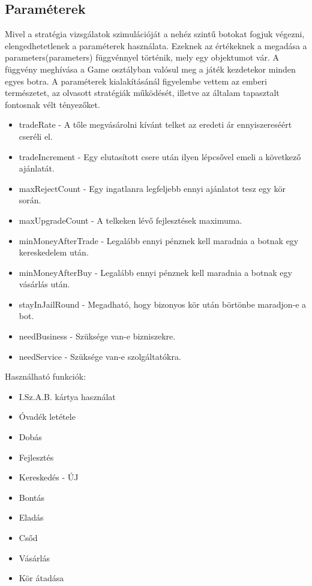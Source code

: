 \subsection{Paraméterek}

Mivel a stratégia vizsgálatok szimulációját a nehéz szintű botokat fogjuk végezni, elengedhetetlenek a paraméterek használata. Ezeknek az értékeknek a megadása a parameters(parameters) függvénnyel történik, mely egy objektumot vár. A függvény meghívása a Game osztályban valósul meg a játék kezdetekor minden egyes botra. A paraméterek kialakításánál figyelembe vettem az emberi természetet, az olvasott stratégiák működését, illetve az általam tapasztalt fontosnak vélt tényezőket.

\begin{itemize}
\item tradeRate - A tőle megvásárolni kívánt telket az eredeti ár ennyiszereséért cseréli el.
\item tradeIncrement - Egy elutasított csere után ilyen lépcsővel emeli a következő ajánlatát.
\item maxRejectCount - Egy ingatlanra legfeljebb ennyi ajánlatot tesz egy kör során.
\item maxUpgradeCount - A telkeken lévő fejlesztések maximuma.
\item minMoneyAfterTrade - Legalább ennyi pénznek kell maradnia a botnak egy kereskedelem után.
\item minMoneyAfterBuy - Legalább ennyi pénznek kell maradnia a botnak egy vásárlás után.
\item stayInJailRound - Megadható, hogy bizonyos kör után börtönbe maradjon-e a bot.
\item needBusiness - Szüksége van-e bizniszekre.
\item needService - Szüksége van-e szolgáltatókra.
\end{itemize}

Használható funkciók:

\begin{itemize}
\item I.Sz.A.B. kártya használat
\item Óvadék letétele
\item Dobás
\item Fejlesztés
\item Kereskedés - ÚJ
\item Bontás
\item Eladás
\item Csőd
\item Vásárlás
\item Kör átadása
\end{itemize}

